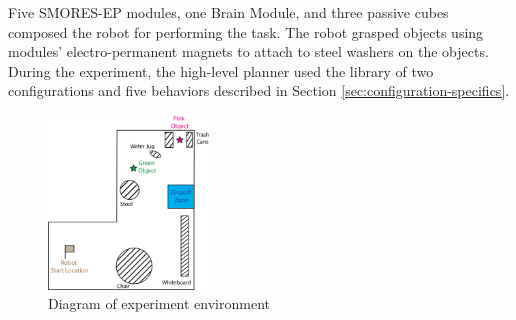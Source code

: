 \documentclass[conference]{IEEEtran}
\begin{document}
Five SMORES-EP modules, one Brain Module, and three passive cubes composed the robot for performing the task. The robot grasped objects using modules' electro-permanent magnets to attach to steel washers on the objects.
During the experiment, the high-level planner used the library of two configurations and five behaviors described in Section \ref{sec:configuration-specifics}.

\begin{figure}
\begin{center}
\includegraphics[width=0.38\textwidth]{images/RSSMap.png}
\caption{Diagram of experiment environment}
\label{fig:map}
\end{center}
\end{figure}
\end{document}
